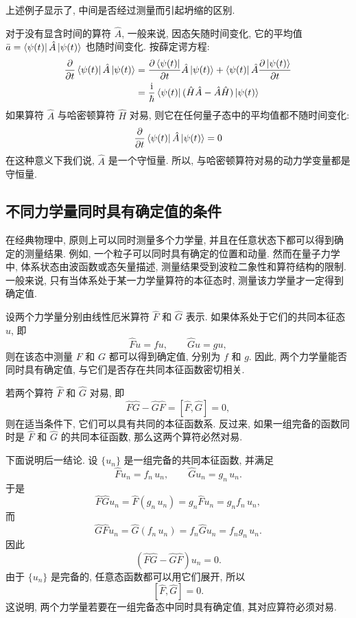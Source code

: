 上述例子显示了, 中间是否经过测量而引起坍缩的区别.

对于没有显含时间的算符 $\hat{A}$, 一般来说, 因态矢随时间变化, 它的平均值 $\bar{a} = \bra{\psi(t)} \hat{A} \ket{\psi(t)}$ 也随时间变化. 按薛定谔方程:
\begin{align*}
\frac{\partial}{\partial t} \bra{\psi(t)} \hat{A} \ket{\psi(t)} &= \frac{\partial \bra{\psi(t)}}{\partial t} \hat{A} \ket{\psi(t)} + \bra{\psi(t)} \hat{A} \frac{\partial \ket{\psi(t)}}{\partial t} \\
&= \frac{\mathop{}\!\mathrm{i}}{\hbar} \bra{\psi(t)} (\hat{H}\hat{A} - \hat{A}\hat{H}) \ket{\psi(t)}
\end{align*}
如果算符 $\hat{A}$ 与哈密顿算符 $\hat{H}$ 对易, 则它在任何量子态中的平均值都不随时间变化:
\[
\frac{\partial}{\partial t} \bra{\psi(t)} \hat{A} \ket{\psi(t)} = 0
\]
在这种意义下我们说, $\hat{A}$ 是一个守恒量. 所以, 与哈密顿算符对易的动力学变量都是守恒量.

\subsection{不同力学量同时具有确定值的条件}

在经典物理中, 原则上可以同时测量多个力学量, 并且在任意状态下都可以得到确定的测量结果. 例如, 一个粒子可以同时具有确定的位置和动量. 然而在量子力学中, 体系状态由波函数或态矢量描述, 测量结果受到波粒二象性和算符结构的限制. 一般来说, 只有当体系处于某一力学量算符的本征态时, 测量该力学量才一定得到确定值.

设两个力学量分别由线性厄米算符 $\hat F$ 和 $\hat G$ 表示. 如果体系处于它们的共同本征态 $u$, 即
\[
\hat F u = f u, \qquad \hat G u = g u,
\]
则在该态中测量 $F$ 和 $G$ 都可以得到确定值, 分别为 $f$ 和 $g$. 因此, 两个力学量能否同时具有确定值, 与它们是否存在共同本征函数密切相关.

若两个算符 $\hat F$ 和 $\hat G$ 对易, 即
\[
\hat F\hat G-\hat G\hat F=[\hat F, \hat G]=0,
\]
则在适当条件下, 它们可以具有共同的本征函数系. 反过来, 如果一组完备的函数同时是 $\hat F$ 和 $\hat G$ 的共同本征函数, 那么这两个算符必然对易.

下面说明后一结论. 设 $\{u_n\}$ 是一组完备的共同本征函数, 并满足
\[
\hat F u_n=f_n\,u_n, \qquad \hat G u_n=g_n\,u_n.
\]
于是
\[
\hat F\hat G u_n
=
\hat F(g_n\,u_n)
=
g_n\hat F u_n
=
g_n f_n\,u_n,
\]
而
\[
\hat G\hat F u_n
=
\hat G(f_n\,u_n)
=
f_n\hat G u_n
=
f_n g_n\,u_n.
\]
因此
\[
(\hat F\hat G-\hat G\hat F)u_n=0.
\]
由于 $\{u_n\}$ 是完备的, 任意态函数都可以用它们展开, 所以
\[
[\hat F, \hat G]=0.
\]
这说明, 两个力学量若要在一组完备态中同时具有确定值, 其对应算符必须对易.

